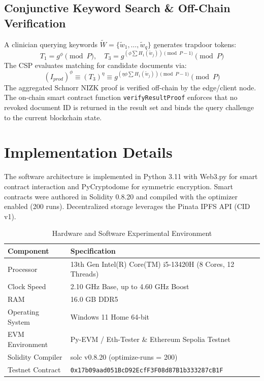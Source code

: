 \documentclass[conference]{IEEEtran}
\begin{document}
\subsection{Conjunctive Keyword Search \& Off-Chain Verification}
A clinician querying keywords $\widetilde{W} = \{\widetilde{w}_1, \dots, \widetilde{w}_q\}$ generates trapdoor tokens:
\begin{equation}
T_1 = g^\phi \pmod P, \quad T_3 = g^{(\phi \sum H_1(\widetilde{w}_j)) \pmod{P-1}} \pmod P
\end{equation}
The CSP evaluates matching for candidate documents via:
\begin{equation}
(I_{prod})^\phi \equiv (T_3)^\eta \equiv g^{(\eta \phi \sum H_1(\widetilde{w}_j)) \pmod{P-1}} \pmod P
\end{equation}
The aggregated Schnorr NIZK proof is verified off-chain by the edge/client node. The on-chain smart contract function \texttt{verifyResultProof} enforces that no revoked document ID is returned in the result set and binds the query challenge to the current blockchain state.

\section{Implementation Details}

The software architecture is implemented in Python 3.11 with Web3.py for smart contract interaction and PyCryptodome for symmetric encryption. Smart contracts were authored in Solidity 0.8.20 and compiled with the optimizer enabled (200 runs). Decentralized storage leverages the Pinata IPFS API (CID v1).

\begin{table}[htbp]
\caption{Hardware and Software Experimental Environment}
\label{tab:env}
\centering
\begin{tabular}{ll}
\toprule
\textbf{Component} & \textbf{Specification} \\
\midrule
Processor & 13th Gen Intel(R) Core(TM) i5-13420H (8 Cores, 12 Threads) \\
Clock Speed & 2.10 GHz Base, up to 4.60 GHz Boost \\
RAM & 16.0 GB DDR5 \\
Operating System & Windows 11 Home 64-bit \\
EVM Environment & Py-EVM / Eth-Tester \& Ethereum Sepolia Testnet \\
Solidity Compiler & solc v0.8.20 (optimize-runs = 200) \\
Testnet Contract & \texttt{0x17b09aad051BcD92EcfF3F08d87B1b333287cB1F} \\
\bottomrule
\end{tabular}
\end{table}
\end{document}
